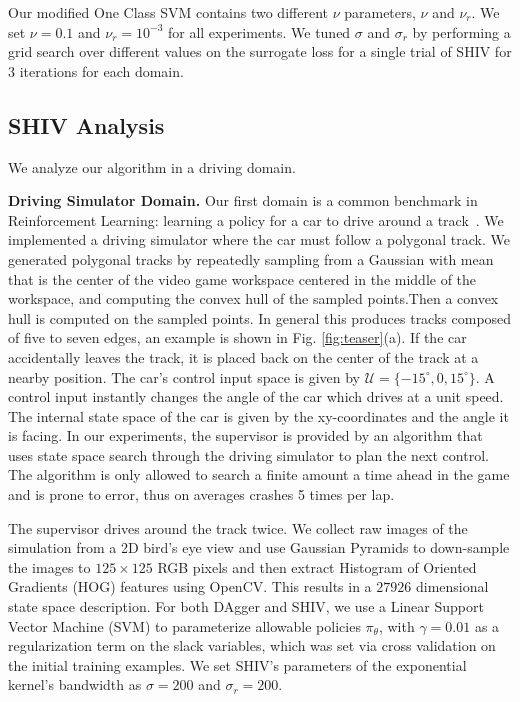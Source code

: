 \documentclass[10pt, conference]{ieeeconf}      %
\newcommand{\acro}{SHIV}
\begin{document}
Our modified One Class SVM contains two different $\nu$ parameters, $\nu$ and $\nu_r$. We set $\nu = 0.1$ and $\nu_r =10^{-3}$ for all experiments. We tuned $\sigma$ and $\sigma_r$ by performing a grid search over different values on the surrogate loss for a single trial of SHIV for 3 iterations for each domain.


\subsection{SHIV Analysis}\label{sec:car}
We analyze our algorithm in a driving domain.

\noindent\textbf{Driving Simulator Domain.}
Our first domain is a common benchmark in Reinforcement Learning: learning a policy for a car to drive around a track~\cite{argall2009survey,ross2010efficient,ross2011reduction}. We implemented a driving simulator where the car must follow a polygonal track. We generated polygonal tracks by repeatedly sampling from a Gaussian with mean that is the center of the video game workspace centered in the middle of the workspace, and computing the convex hull of the sampled points.Then a convex hull is computed on the sampled points. In general this produces tracks composed of five to seven edges, an example is shown in Fig. \ref{fig:teaser}(a). If the car accidentally leaves the track, it is placed
back on the center of the track at a nearby position. The car's control input space is given by  $\mathcal{U} = \lbrace
-15^\circ, 0, 15^\circ \rbrace$. A control input instantly changes the angle of the car which drives at a unit speed. 
The internal state space of the car is given by the
xy-coordinates and the angle it is facing. In our experiments, the supervisor is provided by an algorithm that uses
state space search through the driving simulator to plan the next control. The algorithm is only allowed to search a finite amount a time ahead in the game and is prone to error, thus on averages crashes 5 times per lap. 

The supervisor drives around the track twice. We collect raw images of the simulation from a 2D bird's eye view
and use Gaussian Pyramids to down-sample the images to $125 \times 125$ RGB pixels and then extract Histogram of
Oriented Gradients (HOG) features using OpenCV. This results in a $27926$ dimensional state space description.
For both DAgger and \acro, we use a Linear Support Vector Machine (SVM) to parameterize allowable
policies $\pi_{\theta}$, with $\gamma=0.01$ as a regularization term on the slack variables, which was set via cross
validation on the initial training examples. We set SHIV's parameters  of the exponential kernel's bandwidth as $\sigma = 200$ and $\sigma_r = 200$.
\end{document}

